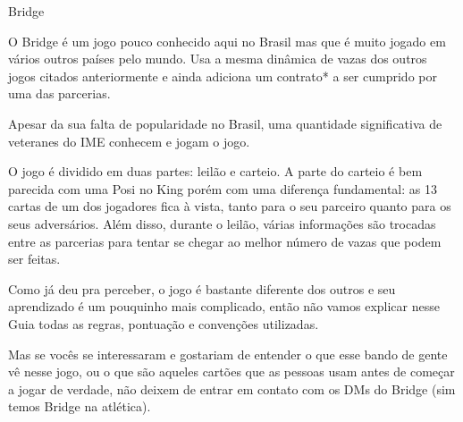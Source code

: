 \begin{subsecao}{Bridge}

O Bridge é um jogo pouco conhecido aqui no Brasil mas que é muito jogado em
vários outros países pelo mundo. Usa a mesma dinâmica de vazas dos outros jogos
citados anteriormente e ainda adiciona um contrato* a ser cumprido por uma das
parcerias.

Apesar da sua falta de popularidade no Brasil, uma quantidade significativa de 
veteranes do IME conhecem e jogam o jogo.

O jogo é dividido em duas partes: leilão e carteio. A parte do carteio é bem
parecida com uma Posi no King porém com uma diferença fundamental: as 13 cartas
de um dos jogadores fica à vista, tanto para o seu parceiro quanto para os seus
adversários. Além disso, durante o leilão, várias informações são trocadas entre
as parcerias para tentar se chegar ao melhor número de vazas que podem ser
feitas.

Como já deu pra perceber, o jogo é bastante diferente dos outros e seu
aprendizado é um pouquinho mais complicado, então não vamos explicar nesse Guia
todas as regras, pontuação e convenções utilizadas.

Mas se vocês se interessaram e gostariam de entender o que esse bando de
gente vê nesse jogo, ou o que são aqueles cartões que as pessoas usam antes de
começar a jogar de verdade, não deixem de entrar em contato com os DMs do
Bridge (sim temos Bridge na atlética).

\end{subsecao}
